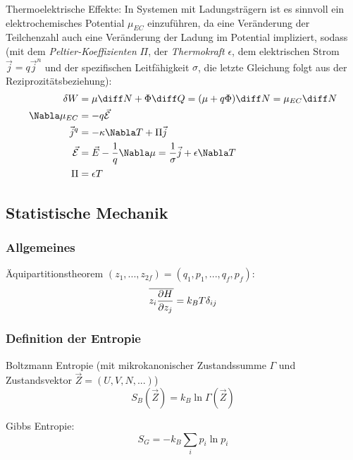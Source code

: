 \documentclass[11pt]{article}
\numberwithin{equation}{section}
\begin{document}
        Thermoelektrische Effekte: In Systemen mit Ladungsträgern ist es sinnvoll ein elektrochemisches Potential $\mu_{EC}$ einzuführen, da eine Veränderung der Teilchenzahl auch eine Veränderung der Ladung im Potential impliziert, sodass (mit dem \emph{Peltier-Koeffizienten} $\Pi$, der \emph{Thermokraft} $\epsilon$, dem elektrischen Strom $\vec{j} = q\vec{j}^n$ und der spezifischen Leitfähigkeit $\sigma$, die letzte Gleichung folgt aus der Reziprozitätsbeziehung):
        \begin{equation}
          \begin{aligned}
            \delta W &= \mu \diff N + \Phi \diff Q = (\mu+q\Phi)\diff N = \mu_{EC} \diff N \\
            \Nabla \mu_{EC} &= -q\vec{\mathcal{E}} \\
            \vec{j}^q &= - \kappa \Nabla T + \Pi \vec{j} \\
            \vec{\mathcal{E}} &= \vec{E} - \frac{1}{q} \Nabla \mu = \frac{1}{\sigma} \vec{j} + \epsilon \Nabla T \\
            \Pi &= \epsilon T \\
          \end{aligned}
        \end{equation}


    \subsection{Statistische Mechanik}
      \subsubsection{Allgemeines}
        Äquipartitionstheorem $(z_1,...,z_{2f}) = (q_1, p_1, ..., q_f, p_f)$:
        \begin{equation}
          \overline{ z_i \frac{\partial H}{\partial z_j}} = k_B T \delta_{ij}
        \end{equation}

      \subsubsection{Definition der Entropie}
        Boltzmann Entropie (mit mikrokanonischer Zustandssumme $\Gamma$ und Zustandsvektor $\vec{Z}=(U,V,N,...)$)
        \begin{equation}
          S_{B}(\vec{Z}) = k_B \ln\Gamma(\vec{Z})
        \end{equation}

        Gibbs Entropie:
        \begin{equation}
          S_{G} = -k_B \sum_i p_i \ln p_i
        \end{equation}
\end{document}
